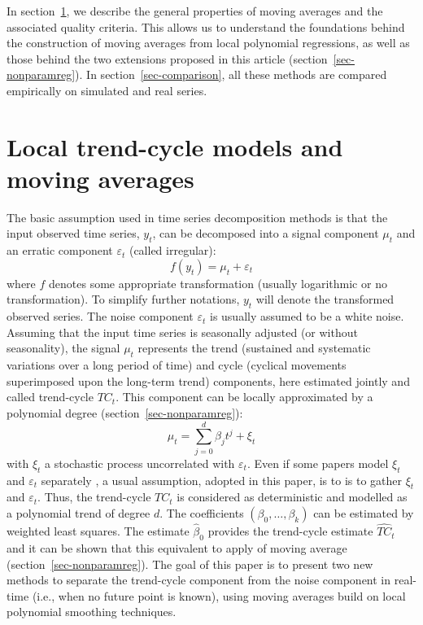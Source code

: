 \documentclass[
]{article}
\newcommand\1{\mathds{1}}
\begin{document}
In section~\ref{sec-propMM}, we describe the general properties of
moving averages and the associated quality criteria. This allows us to
understand the foundations behind the construction of moving averages
from local polynomial regressions, as well as those behind the two
extensions proposed in this article (section~\ref{sec-nonparamreg}). In
section~\ref{sec-comparison}, all these methods are compared empirically
on simulated and real series.

\section{Local trend-cycle models and moving averages}\label{sec-propMM}

The basic assumption used in time series decomposition methods is that
the input observed time series, \(y_t\), can be decomposed into a signal
component \(\mu_t\) and an erratic component \(\varepsilon_t\) (called
irregular): \[
f(y_t)=\mu_t+\varepsilon_t
\] where \(f\) denotes some appropriate transformation (usually
logarithmic or no transformation). To simplify further notations,
\(y_t\) will denote the transformed observed series. The noise component
\(\varepsilon_t\) is usually assumed to be a white noise. Assuming that
the input time series is seasonally adjusted (or without seasonality),
the signal \(\mu_t\) represents the trend (sustained and systematic
variations over a long period of time) and cycle (cyclical movements
superimposed upon the long-term trend) components, here estimated
jointly and called trend-cycle \(TC_t\). This component can be locally
approximated by a polynomial degree (section~\ref{sec-nonparamreg}): \[
\mu_t = \sum_{j=0}^d\beta_jt^j+\xi_t
\] with \(\xi_t\) a stochastic process uncorrelated with
\(\varepsilon_t\). Even if some papers model \(\xi_t\) and
\(\varepsilon_t\) separately \autocite[see for
example][]{GrayThomson2002}, a usual assumption, adopted in this paper,
is to is to gather \(\xi_t\) and \(\varepsilon_t\). Thus, the
trend-cycle \(TC_t\) is considered as deterministic and modelled as a
polynomial trend of degree \(d\). The coefficients
\((\beta_0,\dots,\beta_k)\) can be estimated by weighted least squares.
The estimate \(\hat \beta_0\) provides the trend-cycle estimate
\(\widehat{TC}_t\) and it can be shown that this equivalent to apply of
moving average (section~\ref{sec-nonparamreg}). The goal of this paper
is to present two new methods to separate the trend-cycle component from
the noise component in real-time (i.e., when no future point is known),
using moving averages build on local polynomial smoothing techniques.
\end{document}

